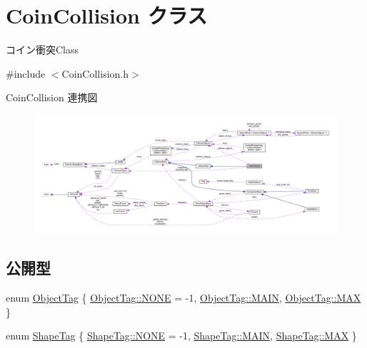 \hypertarget{class_coin_collision}{}\section{Coin\+Collision クラス}
\label{class_coin_collision}


コイン衝突\+Class  




{\ttfamily \#include $<$Coin\+Collision.\+h$>$}



Coin\+Collision 連携図\nopagebreak
\begin{figure}[H]
\begin{center}
\leavevmode
\includegraphics[width=350pt]{class_coin_collision__coll__graph}
\end{center}
\end{figure}
\subsection*{公開型}
\begin{DoxyCompactItemize}
\item 
enum \mbox{\hyperlink{class_coin_collision_ade7912345747f522fd895e87621ce049}{Object\+Tag}} \{ \mbox{\hyperlink{class_coin_collision_ade7912345747f522fd895e87621ce049ab50339a10e1de285ac99d4c3990b8693}{Object\+Tag\+::\+N\+O\+NE}} = -\/1, 
\mbox{\hyperlink{class_coin_collision_ade7912345747f522fd895e87621ce049a186495f7da296bf880df3a22a492b378}{Object\+Tag\+::\+M\+A\+IN}}, 
\mbox{\hyperlink{class_coin_collision_ade7912345747f522fd895e87621ce049a26a4b44a837bf97b972628509912b4a5}{Object\+Tag\+::\+M\+AX}}
 \}
\item 
enum \mbox{\hyperlink{class_coin_collision_a2b0f28f5b989cbf699624ae25f0e019b}{Shape\+Tag}} \{ \mbox{\hyperlink{class_coin_collision_a2b0f28f5b989cbf699624ae25f0e019bab50339a10e1de285ac99d4c3990b8693}{Shape\+Tag\+::\+N\+O\+NE}} = -\/1, 
\mbox{\hyperlink{class_coin_collision_a2b0f28f5b989cbf699624ae25f0e019ba186495f7da296bf880df3a22a492b378}{Shape\+Tag\+::\+M\+A\+IN}}, 
\mbox{\hyperlink{class_coin_collision_a2b0f28f5b989cbf699624ae25f0e019ba26a4b44a837bf97b972628509912b4a5}{Shape\+Tag\+::\+M\+AX}}
 \}
\end{DoxyCompactItemize}
